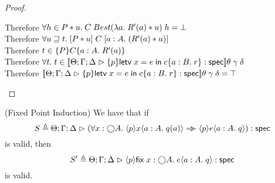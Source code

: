 \begin{proof}
\begin{tabbedproof}
    \oooooo Therefore $\forall h \in P * u.\; C\;Best(\lambda a.\;R'(a) * u)\;h = \bot$\\
    \ooooo Therefore $\forall u \sqsupseteq t.\; [{P * u}]\;{C}\;[{a:A}.\;{(R'(a) * u)}]$ \\
    \ooooo Therefore $t \in \{{P}\}{C}\{{a:A}.\;{R'(a)}\}$ \\
    \oooo Therefore $\forall t.\; t \in [\![{{\Theta; \Gamma; \Delta} \vartriangleright {\{{p}\}{\mathsf{letv}\;x = e\;\mathsf{in}\;c}\{{a:B}.\;{r}\}} : \mathsf{spec}}]\!]\theta\;\gamma\;\delta$ \\
    \oooo Therefore $[\![{{\Theta; \Gamma; \Delta} \vartriangleright {\{{p}\}{\mathsf{letv}\;x = e\;\mathsf{in}\;c}\{{a:B}.\;{r}\}} : \mathsf{spec}}]\!]\theta\;\gamma\;\delta = \top$\\
  \end{tabbedproof}
\end{proof}

\begin{lemma}{(Fixed Point Induction)}
We have that if 
\begin{displaymath}
   S \triangleq 
   {\Theta; \Gamma; \Delta} \vartriangleright {(\forall x:\bigcirc{A}.\; \langle{p}\rangle{x}\langle{a:A}.\;{q(a)}\rangle \Rightarrow\!\!\!>\langle{p}\rangle{e}\langle{a:A}.\;{q}\rangle)} : \mathsf{spec}
\end{displaymath}
\noindent is valid, then 
\begin{displaymath}
  S' \triangleq {\Theta; \Gamma; \Delta} \vartriangleright {\langle{p}\rangle{\mathsf{fix}\;{x:\bigcirc{A}}.\;{e}}\langle{a:A}.\;{q}\rangle} : \mathsf{spec}
\end{displaymath}
is valid.
\end{lemma}

